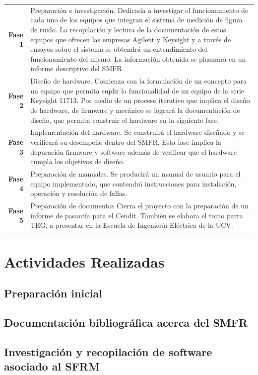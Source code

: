 \documentclass[paper=letter,oneside,fontsize=11pt, parskip=full]{scrartcl}
\begin{document}
	\begin{table}[h!]
		\begin{tabular}{rp{13cm}}
			\textbf{Fase 1} & Preparación e investigación. Dedicada a investigar el funcionamiento de cada uno de los equipos que integran el sistema de medición de figura de ruido. La recopilación y lectura de la documentación de estos equipos que ofrecen las empresas Agilent y Keysight y a través de ensayos sobre el sistema se obtendrá un entendimiento del funcionamiento del mismo. La información obtenida se plasmará en un informe descriptivo del SMFR. \\			
			\textbf{Fase 2} & Diseño de hardware. Comienza con la formulación de un concepto para un equipo que permita suplir la funcionalidad de un equipo de la serie Keysight 11713. Por medio de un proceso iterativo que implica el diseño de hardware, de firmware y mecánico se logrará la documentación de diseño, que permita construir el hardware en la siguiente fase.	\\		
			\textbf{Fase 3} & Implementación del hardware. Se construirá el hardware diseñado y se verificará su desempeño dentro del SMFR. Esta fase implica la depuración firmware y software además de verificar que el hardware cumpla los objetivos de diseño. \\
			\textbf{Fase 4} & Preparación de manuales. Se producirá un manual de usuario para el equipo implementado, que contendrá instrucciones para instalación, operación y resolución de fallas. \\
			\textbf{Fase 5} & Preparación de documentos Cierra el proyecto con la preparación de un informe de pasantía para el Cendit. También se elabora el tomo parra TEG, a presentar en la Escuela de Ingeniería Eléctrica de la UCV.
		\end{tabular}
	\end{table}

	\section{Actividades Realizadas}
	
	\subsection{Preparación inicial}
	\subsection{Documentación bibliográfica acerca del SMFR}
	\subsection{Investigación y recopilación de software asociado al SFRM}
\end{document}
